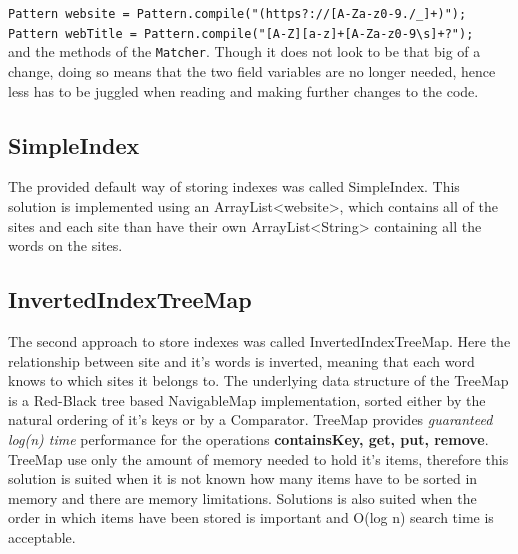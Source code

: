 {\tt Pattern website = Pattern.compile("(https?://[A-Za-z0-9./\_]+)");} \\
{\tt Pattern webTitle = Pattern.compile("[A-Z][a-z]+[A-Za-z0-9\textbackslash s]+?");} \\

and the methods of the {\tt Matcher}. Though it does not look to be that big of a change, doing so means that the two field variables are no longer needed, hence less has to be juggled when reading and making further changes to the code.

\subsection{SimpleIndex}
The provided default way of storing indexes was called SimpleIndex. This solution is implemented using an ArrayList<website>, which contains all of the sites and each site than have their own ArrayList<String>  containing all the words on the sites. \\

\subsection{InvertedIndexTreeMap}
The second approach to store indexes was called InvertedIndexTreeMap. Here the relationship between site and it's words is inverted, meaning that each word knows to which sites it belongs to. The underlying data structure of the TreeMap is a Red-Black tree based NavigableMap implementation, sorted either by the natural ordering of it's keys or by a Comparator. TreeMap provides \textit{guaranteed log(n) time} performance for the operations \textbf{containsKey, get, put, remove}.\cite{oracle:treemap} TreeMap use only the amount of memory needed to hold it's items, therefore this solution is suited when it is not known how many items have to be sorted in memory and there are memory limitations. Solutions is also suited when the order in which items have been stored is important and O(log n) search time is acceptable. \cite{baeldung:HashTreeCompared}

